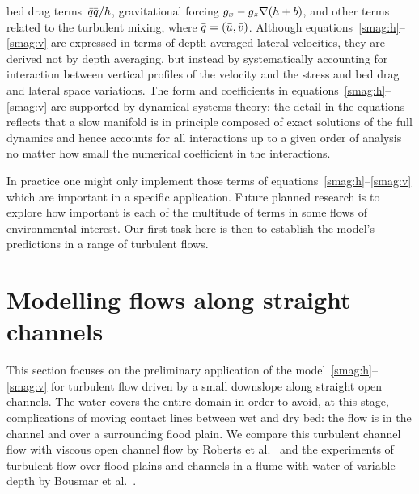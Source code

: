 \documentclass[twocolumn]{afmc_art}
\newcommand{\uu}{{\bar u}}
\newcommand{\vv}{{\bar v}}
\newcommand{\bq}{{\bar q}}
\newcommand{\qq}{{\bar{\vec q}}}
\renewcommand{\vec}[1]{\text{\boldmath$#1$}}
\begin{document}
bed drag terms~$\bq{\qq}/{h}$, gravitational forcing $g_x-g_z{\grad(h+b)}$, and other terms related to the turbulent mixing, where $\qq=(\uu,\vv)$. 
Although equations~\eqref{smag:h}--\eqref{smag:v} are expressed in terms of depth averaged lateral velocities, they are derived not by depth averaging, but instead by systematically accounting for interaction between vertical profiles of the velocity and the stress and bed drag and lateral space variations. 
The form and coefficients in equations~\eqref{smag:h}--\eqref{smag:v} are supported by dynamical systems theory: the detail in the equations reflects that a slow manifold is in principle composed of exact solutions of the full dynamics and hence accounts for all interactions up to a given order of analysis no matter how small the numerical coefficient in the interactions.

In practice one might only implement those terms of equations~\eqref{smag:h}--\eqref{smag:v} which are important in a specific application.
Future planned research is to explore how important is each of the multitude of terms in some flows of environmental interest.
Our first task here is then to establish the model's predictions in a range of turbulent flows.

\section{Modelling flows along straight channels}




This section focuses on the preliminary application of the model~\eqref{smag:h}--\eqref{smag:v} for turbulent flow driven by a small downslope along straight open channels.
The water covers the entire domain in order to avoid, at this stage, complications of moving contact lines between wet and dry bed: the flow is in the channel and over a surrounding flood plain.
We compare this turbulent channel flow with viscous open channel flow by Roberts et al.~\cite{Robertsli2006} and the experiments of turbulent flow over flood plains and channels in a flume with water of variable depth by Bousmar et al.~\cite{Bousmar2002,Bousmar2003a}.
\end{document}
